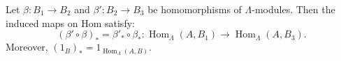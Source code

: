 Let $\beta \colon B_1 \to B_2$ and $\beta' \colon B_2 \to B_3$ be homomorphisms of $\Lambda$-modules. Then the induced maps on Hom satisfy:
$$
(\beta' \circ \beta)_{*} = \beta'_{*} \circ \beta_{*} \colon \operatorname{Hom}_{\Lambda}(A, B_1) \longrightarrow \operatorname{Hom}_{\Lambda}(A, B_3).
$$
Moreover, $(1_{B})_{*} = 1_{\operatorname{Hom}_{\Lambda}(A, B)}$.

